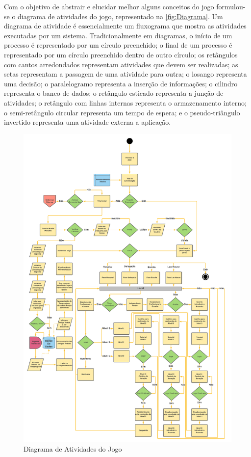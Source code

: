 Com o objetivo de abstrair e elucidar melhor alguns conceitos do jogo formulou-se o diagrama de atividades do jogo, representado na \autoref{fig:Diagrama}. Um diagrama de atividade é essencialmente um fluxograma que mostra as atividades executadas por um sistema. Tradicionalmente em diagramas, o início de um processo é representado por um círculo preenchido; o final de um processo é representado por um círculo preenchido dentro de outro círculo; os retângulos com cantos arredondados representam atividades que devem ser realizadas; as setas representam a passagem de uma atividade para outra; o losango representa uma decisão; o paralelogramo representa a inserção de informações; o cilindro representa o banco de dados; o retângulo esticado representa a junção de atividades; o retângulo com linhas internas representa o armazenamento interno; o semi-retângulo circular representa um tempo de espera; e o pseudo-triângulo invertido representa uma atividade externa a aplicação.





\begin{figure}[hbt!]
\caption{\label{fig:Diagrama}Diagrama de Atividades do Jogo}\vspace{-0.4cm}
\begin{center}
  \includegraphics[width=0.95\linewidth]{./Figuras/DiagramaJoginho.png}
  \end{center}\vspace{-0.6cm}

\end{figure}


